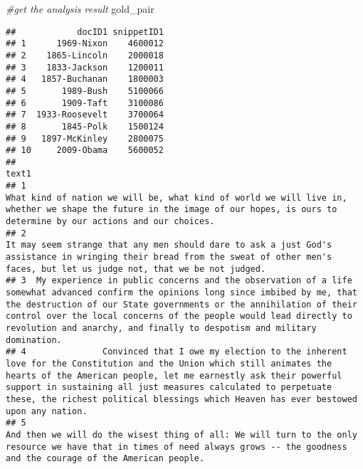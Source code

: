 \documentclass[]{article}
\newenvironment{Shaded}{\begin{snugshade}}{\end{snugshade}}
\newcommand{\CommentTok}[1]{\textcolor[rgb]{0.56,0.35,0.01}{\textit{#1}}}
\newcommand{\NormalTok}[1]{#1}
\begin{document}
\begin{Shaded}
\begin{Highlighting}[]
\CommentTok{#get the analysis result}
\NormalTok{gold_pair}
\end{Highlighting}
\end{Shaded}

\begin{verbatim}
##            docID1 snippetID1
## 1      1969-Nixon    4600012
## 2    1865-Lincoln    2000018
## 3    1833-Jackson    1200011
## 4   1857-Buchanan    1800003
## 5       1989-Bush    5100066
## 6       1909-Taft    3100086
## 7  1933-Roosevelt    3700064
## 8       1845-Polk    1500124
## 9   1897-McKinley    2800075
## 10     2009-Obama    5600052
##                                                                                                                                                                                                                                                                                                                                                        text1
## 1                                                                                                                                                                            What kind of nation we will be, what kind of world we will live in, whether we shape the future in the image of our hopes, is ours to determine by our actions and our choices.
## 2                                                                                                                                                                      It may seem strange that any men should dare to ask a just God's assistance in wringing their bread from the sweat of other men's faces, but let us judge not, that we be not judged.
## 3  My experience in public concerns and the observation of a life somewhat advanced confirm the opinions long since imbibed by me, that the destruction of our State governments or the annihilation of their control over the local concerns of the people would lead directly to revolution and anarchy, and finally to despotism and military domination.
## 4               Convinced that I owe my election to the inherent love for the Constitution and the Union which still animates the hearts of the American people, let me earnestly ask their powerful support in sustaining all just measures calculated to perpetuate these, the richest political blessings which Heaven has ever bestowed upon any nation.
## 5                                                                                                                                                                          And then we will do the wisest thing of all: We will turn to the only resource we have that in times of need always grows -- the goodness and the courage of the American people.

\end{verbatim}
\end{document}
